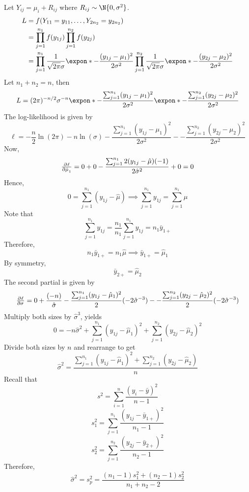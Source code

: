 \begin{Example}{}{}
    Let $ Y_{ij}=\mu_i+R_{ij} $ where $ R_{ij}\sim\N{0,\sigma^2} $.
    \begin{align*}
        L & =f(Y_{11}=y_{11},\ldots,Y_{2n_2}=y_{2n_2})                                                \\
          & =\prod_{j=1}^{n_1}f(y_{1j})\prod_{j=1}^{n_2}f(y_{2j})                                     \\
          & =\prod_{j=1}^{n_1}\frac{1}{\sqrt{2\pi}\sigma}\expon*{-\frac{(y_{1j}-\mu_1)^2}{2\sigma^2}}
        \prod_{j=1}^{n_2}\frac{1}{\sqrt{2\pi}\sigma}\expon*{-\frac{(y_{2j}-\mu_2)^2}{2\sigma^2}}
    \end{align*}
    Let $ n_1+n_2=n $, then
    \[ L=(2\pi)^{-n/2}\sigma^{-n}\expon*{-\frac{\sum_{j=1}^{n_1}(y_{1j}-\mu_1)^2}{2\sigma^2}}
        \expon*{-\frac{\sum_{j=1}^{n_2}(y_{2j}-\mu_2)^2}{2\sigma^2}} \]
    The log-likelihood is given by
    \[ \ell=-\frac{n}{2}\ln(2\pi)-n\ln(\sigma)-\frac{\sum_{j=1}^{n_1} (y_{1j}-\mu_1)^2}{2\sigma^2}-
        -\frac{\sum_{j=1}^{n_2}(y_{2j}-\mu_2)^2}{2\sigma^2} \]
    Now,
    \[ \pd{\ell}{\hat{\mu}_1}=0+0-\frac{\sum_{j=1}^{n_1}2(y_{1j}-\hat{\mu})(-1) }{2\hat{\sigma}^2}+0=0 \]
    Hence,
    \[ 0=\sum_{j=1}^{n_1}(y_{1j}-\hat{\mu})\implies \sum_{j=1}^{n_1}y_{1j}=\sum_{j=1}^{n_1}\hat{\mu} \]
    Note that
    \[ \sum_{j=1}^{n_1}y_{1j}=\frac{n_1}{n_1} \sum_{j=1}^{n_1} y_{1j}=n_1\bar{y}_{1+}  \]
    Therefore,
    \[ n_1\bar{y}_{1+}=n_1\hat{\mu}\implies \bar{y}_{1+}=\hat{\mu}_1 \]
    By symmetry,
    \[ \bar{y}_{2+}=\hat{\mu}_2 \]
    The second partial is given by
    \[ \pd{\ell}{\sigma}=0+\frac{(-n)}{\hat{\sigma}}-\frac{\sum_{j=1}^{n_1} (y_{1j}-\hat{\mu}_1)^2}{2}(-2\hat{\sigma}^{-3})-
        -\frac{\sum_{j=1}^{n_2}(y_{2j}-\hat{\mu}_2)^2}{2}(-2\hat{\sigma}^{-3})
    \]
    Multiply both sizes by $ \hat{\sigma}^3 $, yields
    \[ 0=-n\hat{\sigma}^2+\sum_{j=1}^{n_1} (y_{1j}-\hat{\mu}_1)^2
        +\sum_{j=1}^{n_2}(y_{2j}-\hat{\mu}_2)^2 \]
    Divide both sizes by $ n $ and rearrange to get
    \[ \hat{\sigma}^2=\frac{\sum_{j=1}^{n_1} (y_{1j}-\hat{\mu}_1)^2+\sum_{j=1}^{n_{2}}(y_{2j}-\hat{\mu}_2) }{n} \]
    Recall that
    \[ s^2=\sum_{i=1}^{n} \frac{(y_i-\bar{y})^2}{n-1}  \]
    \[ s_1^2=\sum_{j=1}^{n_1}\frac{(y_{1j}-\bar{y}_{1+})^2}{n_1-1} \]
    \[ s_2^2=\sum_{j=1}^{n_2}\frac{(y_{2j}-\bar{y}_{2+})^2}{n_2-1} \]
    Therefore,
    \[ \hat{\sigma}^2=s_p^2=\frac{(n_1-1)s_1^2+(n_2-1)s_2^2}{n_1+n_2-2}  \]
\end{Example}

